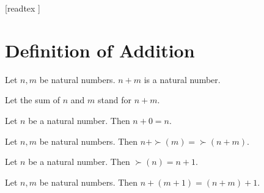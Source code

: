\documentclass[10pt]{article}
\begin{document}
  \begin{imports}
    \begin{forthel}
      [readtex ]
    \end{forthel}
  \end{imports}


  \section{Definition of Addition}

  \begin{forthel}
    \begin{signature}
      Let $n, m$ be natural numbers.
      $n + m$ is a natural number.
    \end{signature}

    Let the sum of $n$ and $m$ stand for $n + m$.
  \end{forthel}

  \begin{forthel}
    \begin{axiom}
      Let $n$ be a natural number.
      Then $n + 0 = n$.
    \end{axiom}
  \end{forthel}

  \begin{forthel}
    \begin{axiom}
      Let $n, m$ be natural numbers.
      Then $n + \succ(m) = \succ(n + m)$.
    \end{axiom}
  \end{forthel}

  \begin{forthel}
    \begin{lemma}
      Let $n$ be a natural number.
      Then $\succ(n) = n + 1$.
    \end{lemma}
  \end{forthel}

  \begin{forthel}
    \begin{lemma}
      Let $n, m$ be natural numbers.
      Then $n + (m + 1) = (n + m) + 1$.
    \end{lemma}
  \end{forthel}
\end{document}
